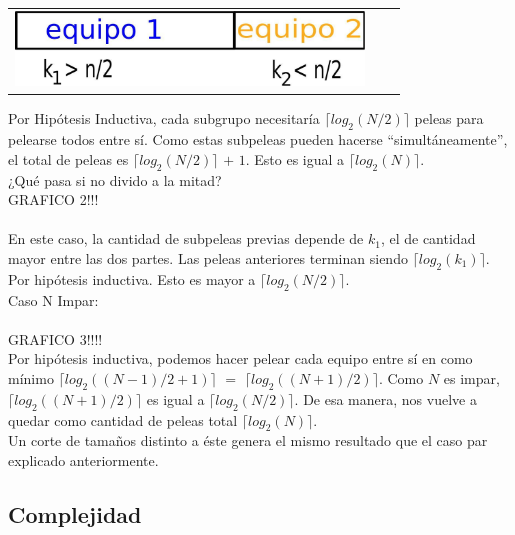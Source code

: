         {\begin{tabular}{ccc}
         \includegraphics[height=2cm]{graficos/kaioken-desarrollo-1.jpg} 

          \end{tabular}}

        Por Hipótesis Inductiva, cada subgrupo necesitaría $\lceil log_{2}(N/2) \rceil$ peleas para pelearse todos entre sí. Como estas subpeleas pueden hacerse “simultáneamente”, el total de peleas es $\lceil log_{2}(N/2) \rceil$ $+$ $1$. Esto es igual a $\lceil log_{2}(N) \rceil$. \\

        ¿Qué pasa si no divido a la mitad?\\


        GRAFICO 2!!!\\
        \\

        En este caso, la cantidad de subpeleas previas depende de $k_{1}$, el de cantidad mayor entre las dos partes. Las peleas anteriores terminan siendo $\lceil log_{2}(k_{1}) \rceil$. Por hipótesis inductiva. Esto es mayor a $\lceil log_{2}(N/2) \rceil$. \\

        Caso N Impar: \\
        \\

        GRAFICO 3!!!!
        \\

        Por hipótesis inductiva, podemos hacer pelear cada equipo entre sí en como mínimo $\lceil log_{2}((N-1)/2+1) \rceil$ $=$ $\lceil log_{2}((N+1)/2) \rceil$. Como $N$ es impar, $\lceil log_{2}((N+1)/2) \rceil$ es igual a $\lceil log_{2}(N/2) \rceil$. De esa manera, nos vuelve a quedar como cantidad de peleas total $\lceil log_{2}(N) \rceil$. \\

        Un corte de tamaños distinto a éste genera el mismo resultado que el caso par explicado anteriormente. \;






    \subsection{Complejidad}

